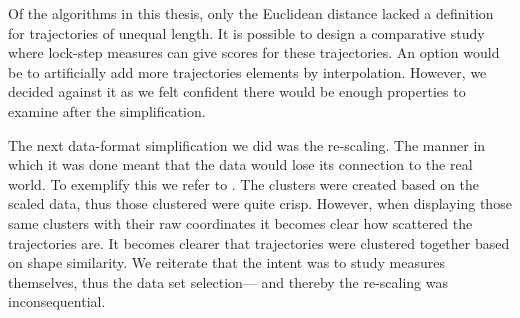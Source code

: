 Of the algorithms in this thesis, only the Euclidean distance lacked a definition for trajectories of unequal length. 
It is possible to design a comparative study where lock-step measures can give scores for these trajectories. 
An option would be to artificially add more trajectories elements by interpolation. 
However, we decided against it as we felt confident there would be enough properties to examine after the simplification. 

The next data-format simplification we did was the re-scaling.
The manner in which it was done meant that the data would lose its connection to the real world.
To exemplify this we refer to . 
The clusters were created based on the scaled data, thus those clustered were quite crisp. 
However, when displaying those same clusters with their raw coordinates it becomes clear how scattered the trajectories are.
It becomes clearer that trajectories were clustered together based on shape similarity. 
We reiterate that the intent was to study measures themselves, thus the data set selection— and thereby the re-scaling was inconsequential. 



